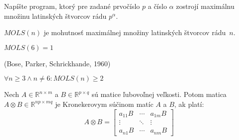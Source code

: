 \begin{exercise}
Napíšte program, ktorý pre zadané prvočíslo $p$ a číslo $\alpha$ zostrojí maximálnu množinu latinských štvorcov rádu $p^\alpha$.
\end{exercise}


\begin{definition}
$MOLS(n)$ je mohutnosť maximálnej množiny latinských štvorcov rádu~$n$.
\end{definition}

\begin{remark}
$MOLS(6) = 1$
\end{remark}

\begin{theorem_hard}{(Bose, Parker, Schrickhande, 1960)}

$\forall n \geq 3 \wedge n \neq 6: MOLS(n) \geq 2$

\end{theorem_hard}


\begin{definition}
Nech $A \in \mathbb{R}^{n\times m}$ a $B \in \mathbb{R}^{p \times q}$ sú matice ľubovoľnej veľkosti.
Potom matica $A \otimes B \in \mathbb{R}^{np \times mq}$ je Kronekerovym súčinom matíc $A$ a $B$, ak platí:
$$
A \otimes B = 
\begin{bmatrix} a_{1 1} B & \cdots & a_{1 m} B \\ \vdots & \ddots & \vdots \\ a_{n 1} B & \cdots & a_{n m} B
\end{bmatrix}
$$
\end{definition}


